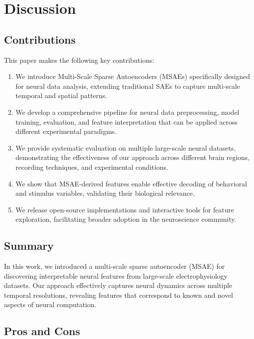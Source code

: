 \section{Discussion}

\subsection{Contributions}

This paper makes the following key contributions:

\begin{enumerate}
\item We introduce Multi-Scale Sparse Autoencoders (MSAEs) specifically designed for neural data analysis, extending traditional SAEs to capture multi-scale temporal and spatial patterns.

\item We develop a comprehensive pipeline for neural data preprocessing, model training, evaluation, and feature interpretation that can be applied across different experimental paradigms.

\item We provide systematic evaluation on multiple large-scale neural datasets, demonstrating the effectiveness of our approach across different brain regions, recording techniques, and experimental conditions.

\item We show that MSAE-derived features enable effective decoding of behavioral and stimulus variables, validating their biological relevance.

\item We release open-source implementations and interactive tools for feature exploration, facilitating broader adoption in the neuroscience community.
\end{enumerate}

\subsection{Summary}

In this work, we introduced a multi-scale sparse autoencoder (MSAE) for discovering interpretable neural features from large-scale electrophysiology datasets. Our approach effectively captures neural dynamics across multiple temporal resolutions, revealing features that correspond to known and novel aspects of neural computation.

\subsection{Pros and Cons}

